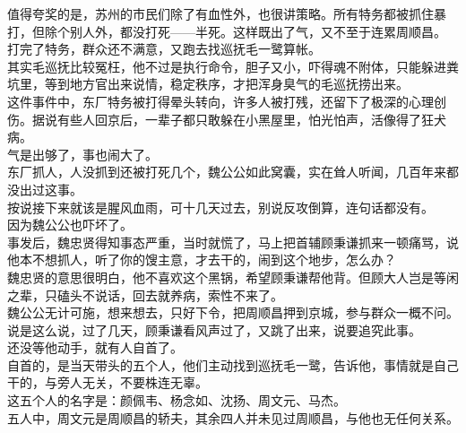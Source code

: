 \begin{multicols}{\theparacolNo}
值得夸奖的是，苏州的市民们除了有血性外，也很讲策略。所有特务都被抓住暴打，但除个别人外，都没打死——半死。这样既出了气，又不至于连累周顺昌。\\

打完了特务，群众还不满意，又跑去找巡抚毛一鹭算帐。\\

其实毛巡抚比较冤枉，他不过是执行命令，胆子又小，吓得魂不附体，只能躲进粪坑里，等到地方官出来说情，稳定秩序，才把浑身臭气的毛巡抚捞出来。\\

这件事件中，东厂特务被打得晕头转向，许多人被打残，还留下了极深的心理创伤。据说有些人回京后，一辈子都只敢躲在小黑屋里，怕光怕声，活像得了狂犬病。\\

气是出够了，事也闹大了。\\

东厂抓人，人没抓到还被打死几个，魏公公如此窝囊，实在耸人听闻，几百年来都没出过这事。\\

按说接下来就该是腥风血雨，可十几天过去，别说反攻倒算，连句话都没有。\\

因为魏公公也吓坏了。\\

事发后，魏忠贤得知事态严重，当时就慌了，马上把首辅顾秉谦抓来一顿痛骂，说他本不想抓人，听了你的馊主意，才去干的，闹到这个地步，怎么办？\\

魏忠贤的意思很明白，他不喜欢这个黑锅，希望顾秉谦帮他背。但顾大人岂是等闲之辈，只磕头不说话，回去就养病，索性不来了。\\

魏公公无计可施，想来想去，只好下令，把周顺昌押到京城，参与群众一概不问。\\

说是这么说，过了几天，顾秉谦看风声过了，又跳了出来，说要追究此事。\\

还没等他动手，就有人自首了。\\

自首的，是当天带头的五个人，他们主动找到巡抚毛一鹭，告诉他，事情就是自己干的，与旁人无关，不要株连无辜。\\

这五个人的名字是：颜佩韦、杨念如、沈扬、周文元、马杰。\\

五人中，周文元是周顺昌的轿夫，其余四人并未见过周顺昌，与他也无任何关系。\\


\end{multicols}
